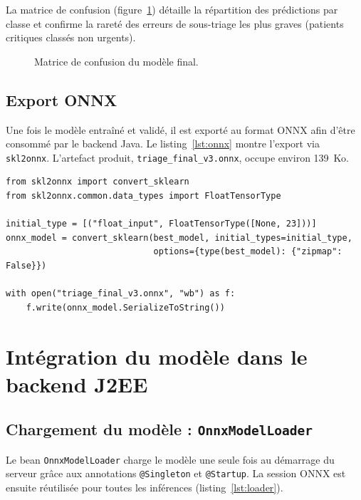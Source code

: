\noindent La matrice de confusion (figure~\ref{fig:confusion}) détaille la répartition des
prédictions par classe et confirme la rareté des erreurs de sous-triage les plus graves
(patients critiques classés non urgents).

\begin{figure}[h]
\centering
\caption{Matrice de confusion du modèle final.}
\label{fig:confusion}
\end{figure}

\subsection{Export ONNX}
Une fois le modèle entraîné et validé, il est exporté au format ONNX afin d'être consommé par le
backend Java. Le listing~\ref{lst:onnx} montre l'export via \texttt{skl2onnx}. L'artefact produit,
\texttt{triage\_final\_v3.onnx}, occupe environ 139~Ko.

\begin{listing}[H]
\begin{verbatim}
from skl2onnx import convert_sklearn
from skl2onnx.common.data_types import FloatTensorType

initial_type = [("float_input", FloatTensorType([None, 23]))]
onnx_model = convert_sklearn(best_model, initial_types=initial_type,
                             options={type(best_model): {"zipmap": False}})

with open("triage_final_v3.onnx", "wb") as f:
    f.write(onnx_model.SerializeToString())
\end{verbatim}
\caption{Export du modèle au format ONNX (entrée \texttt{float\_input} de dimension 23).}
\label{lst:onnx}
\end{listing}

\section{Intégration du modèle dans le backend J2EE}

\subsection{Chargement du modèle : \texttt{OnnxModelLoader}}
Le bean \texttt{OnnxModelLoader} charge le modèle une seule fois au démarrage du serveur grâce aux
annotations \texttt{@Singleton} et \texttt{@Startup}. La session ONNX est ensuite réutilisée pour
toutes les inférences (listing~\ref{lst:loader}).

